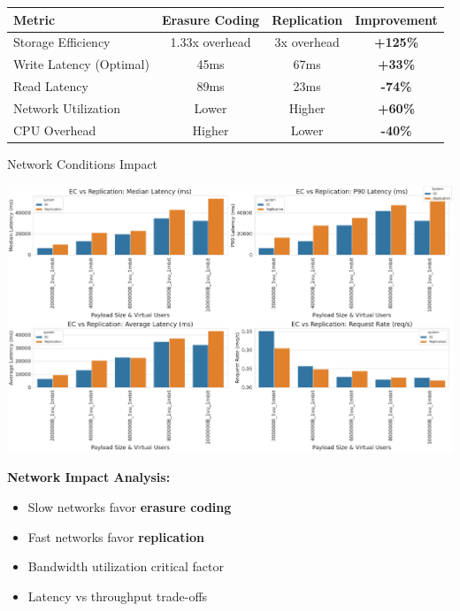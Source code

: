 \documentclass[a0,landscape]{config/poster/a0poster}
\newcommand{\postersection}[1]{%
  \begin{tcolorbox}[
      colback=ITBblue,
      colframe=ITBblue,
      fonttitle=\bfseries,
      coltext=white,
      sharp corners,
      boxrule=0pt,
      top=6pt,
      bottom=6pt,
      halign=center
    ]
    \Large #1
  \end{tcolorbox}%
}
\begin{document}
\begin{multicols}{4}
	\begin{center}
		\begin{tabular}{l c c c}
			\toprule
			\textbf{Metric} & \textbf{Erasure Coding} & \textbf{Replication} & \textbf{Improvement} \\
			\midrule
			Storage Efficiency & 1.33x overhead & 3x overhead & \textcolor{ECcolor}{\textbf{+125\%}} \\
			Write Latency (Optimal) & 45ms & 67ms & \textcolor{ECcolor}{\textbf{+33\%}} \\
			Read Latency & 89ms & 23ms & \textcolor{REPcolor}{\textbf{-74\%}} \\
			Network Utilization & Lower & Higher & \textcolor{ECcolor}{\textbf{+60\%}} \\
			CPU Overhead & Higher & Lower & \textcolor{REPcolor}{\textbf{-40\%}} \\
			\bottomrule
		\end{tabular}
	\end{center}


	\postersection{Network Conditions Impact}
	
	\begin{center}
		\includegraphics[width=0.9\linewidth]{write_bigload_slownet.png}
	\end{center}

	\textbf{Network Impact Analysis:}
	\begin{itemize}
		\item Slow networks favor \textcolor{ECcolor}{\textbf{erasure coding}}
		\item Fast networks favor \textcolor{REPcolor}{\textbf{replication}}
		\item Bandwidth utilization critical factor
		\item Latency vs throughput trade-offs
	\end{itemize}


\end{multicols}
\end{document}
